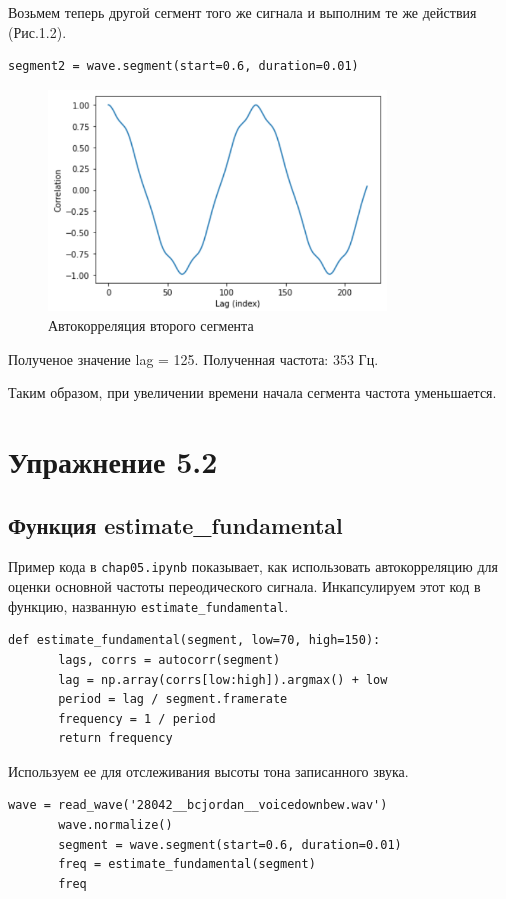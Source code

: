 \documentclass[a4paper,12pt]{report}
\begin{document}
     Возьмем теперь другой сегмент того же сигнала и выполним те же действия (Рис.1.2).
\begin{lstlisting}[caption=Получение сегмента]
       segment2 = wave.segment(start=0.6, duration=0.01)
\end{lstlisting} 
\begin{figure}[H]
        \centering
        \includegraphics[width=0.8\textwidth]{fig1-2.PNG}
        \caption{Автокорреляция второго сегмента}
        \label{fig:fig1-2}
\end{figure} 

    Полученое значение lag = 125. Полученная частота: 353 Гц. 
    
    Таким образом, при увеличении времени начала сегмента частота уменьшается.

\chapter{Упражнение 5.2}
\section{Функция estimate\_fundamental}
    Пример кода в \texttt{chap05.ipynb} показывает, как использовать автокорреляцию для оценки основной частоты переодического сигнала. Инкапсулируем этот код в функцию, названную \texttt{estimate\_fundamental}.
\begin{lstlisting}[caption=Функция estimate\_fundamental]
       def estimate_fundamental(segment, low=70, high=150):
       lags, corrs = autocorr(segment)
       lag = np.array(corrs[low:high]).argmax() + low
       period = lag / segment.framerate
       frequency = 1 / period
       return frequency
\end{lstlisting}

    Используем ее для отслеживания высоты тона записанного звука. 
\begin{lstlisting}[caption=Применение функции]
       wave = read_wave('28042__bcjordan__voicedownbew.wav')
       wave.normalize()
       segment = wave.segment(start=0.6, duration=0.01)
       freq = estimate_fundamental(segment)
       freq
\end{lstlisting} 
\end{document}
